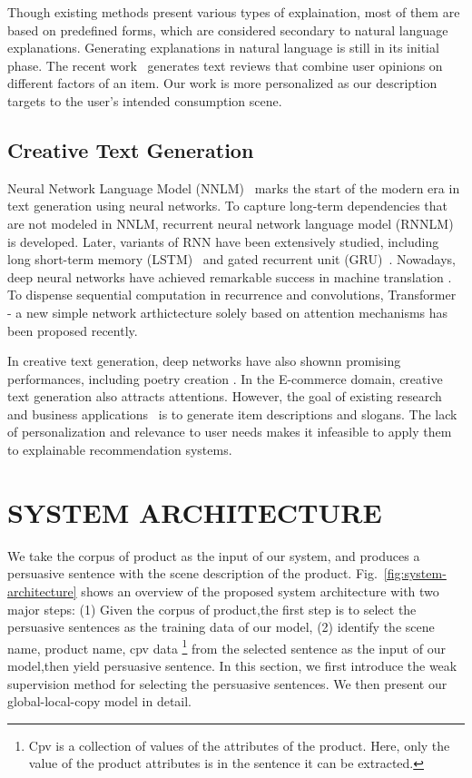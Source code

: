 \documentclass[sigconf]{acmart}
\begin{document}
Though existing methods present various types of explaination, most of them are based on predefined forms, which are considered secondary to natural language explanations. Generating explanations in natural language is still in its initial phase. The recent work~\cite{Costa2018Automatic} generates text reviews that combine user opinions on different factors of an item. Our work is more personalized as our description targets to the user's intended consumption scene. 

\subsection{Creative Text Generation}
Neural Network Language Model (NNLM)~\cite{Bengio2003neural} marks the start of the modern era in text generation using neural networks. To capture long-term dependencies that are not modeled in NNLM, recurrent neural network language model (RNNLM)~\cite{} is developed. Later, variants of RNN have been extensively studied, including long short-term memory (LSTM)~\cite{} and gated recurrent unit (GRU)~\cite{}. Nowadays, deep neural networks have achieved remarkable success in machine translation \cite{Kalchbrenner2016Neural,Zhou2016Deep,Wu2016Google}. To dispense sequential computation in recurrence and convolutions, Transformer~\cite{vaswani2017attention}  - a new simple network arthictecture solely based on attention mechanisms has been proposed recently.


In creative text generation, deep networks have also shownn promising performances, including poetry creation \cite{Colton2012Full,Oliveira2015Tra,Ghazvininejad2016Generating,Yi2017Generating,Zhang2014Chinese,wang2016chinese}. In the E-commerce domain, creative text generation also attracts attentions. However, the goal of existing research~\cite{ozbal2013brainsup,munigala2018persuaide} and business applications~\cite{slogan} is to generate item descriptions and slogans. The lack of personalization and relevance to user needs makes it infeasible to apply them to explainable recommendation systems.



\section{SYSTEM ARCHITECTURE}\label{sec:architecture}
We take the corpus of product as the input of our system, and produces a persuasive sentence with the scene description of the product. Fig.~\ref{fig:system-architecture} shows an overview of the proposed system architecture with two major steps: (1) Given the corpus of product,the first step is to select the persuasive sentences as the training data of our model, (2) identify the scene name, product name, cpv data \footnote{Cpv is a collection of values of the attributes of the product. Here, only the value of the product attributes is in the sentence it can be extracted.} from the selected sentence as the input of our model,then yield persuasive sentence. In this section, we first introduce the weak supervision method for selecting the persuasive sentences. We then present our global-local-copy model in detail.  
\end{document}
